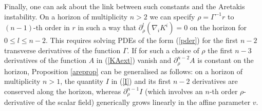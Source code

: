 \documentclass[11pt, reqno]{amsart}
\theoremstyle{plain}
\theoremstyle{definition}
\numberwithin{equation}{section}
\begin{document}
Finally, one can ask about the link between such constants and the Aretakis instability. On a horizon of multiplicity $n > 2$ we can specify $\rho = \Gamma^{-1}r$ to $(n-1)$-th order in $r$ in such a way that $\partial_\rho^{l}(\nabla_iK^i) = 0$ on the horizon for $0 \leq l \leq n-2$. This requires solving PDEs of the form (\ref{pder}) for the first $n -2$ transverse derivatives of the function $\Gamma$. If for such a choice of $\rho$ the first $n-3$ derivatives of the function $A$ in (\ref{KAext}) vanish and $\partial_\rho^{n-2}A$ is constant on the horizon, Proposition \ref{areprop} can be generalised as follows: on a horizon of multiplicity $n > 1$, the quantity $I$ in (\ref{I}) and its first $n-2$ derivatives are conserved along the horizon, whereas $\partial_\rho^{n-1}I$ (which involves an $n$-th order $\rho$-derivative of the scalar field) generically grows linearly in the affine parameter $v$.

\appendix
\end{document}
